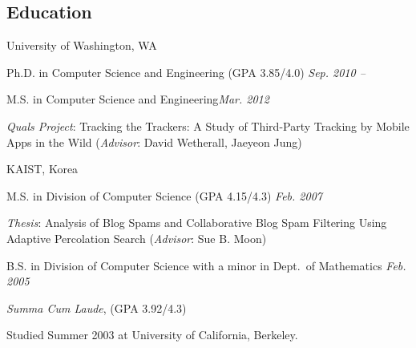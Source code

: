 \documentclass[margin,line]{res}
\newenvironment{list1}{
  \begin{list}{\ding{113}}{%
      \setlength{\itemsep}{0in}
      \setlength{\parsep}{0in} \setlength{\parskip}{0in}
      \setlength{\topsep}{0in} \setlength{\partopsep}{0in}
      \setlength{\leftmargin}{0.17in}}}{\end{list}}
\begin{document}
\begin{resume}
\section{\sc Education}
University of Washington, WA \\
\vspace*{-.1in}
\begin{list1}
\item[] Ph.D. in Computer Science and Engineering (GPA 3.85/4.0) \hfill{\it Sep. 2010 -- }
\item[] M.S. in Computer Science and Engineering\hfill{\it Mar. 2012}
\item[] \textit{Quals Project}: Tracking the Trackers: A Study of Third-Party Tracking by Mobile Apps in the Wild (\textit{Advisor}: David Wetherall, Jaeyeon Jung) 
\end{list1}


KAIST, Korea  \\
\vspace*{-.1in}
\begin{list1}
\item[] M.S. in Division of Computer Science (GPA 4.15/4.3) \hfill{\it Feb. 2007}
\item[] \textit{Thesis}: Analysis of Blog Spams and Collaborative Blog Spam Filtering Using Adaptive Percolation Search (\textit{Advisor}: Sue B. Moon)
\item[] 
\item[] B.S. in Division of Computer Science with a minor in Dept.~of Mathematics \hfill{\it Feb. 2005}
\item[] \textit{Summa Cum Laude}, (GPA 3.92/4.3)
\item[] Studied Summer 2003 at University of California, Berkeley. 
\end{list1}





\end{resume}
\end{document}
